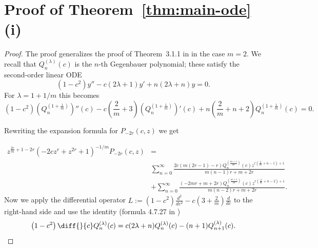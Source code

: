 \documentclass[final,nopreprintline]{elsarticle}
\theoremstyle{definition}
\numberwithin{equation}{section}
\theoremstyle{remark}
\begin{document}
\medskip

\appendix

\section{Proof of Theorem~\ref{thm:main-ode}(i)}\label{app:proof-type1}

\begin{proof}
The proof generalizes the proof of Theorem~3.1.1 in \cite{Cox2013DJKMPolynomials}
in the case $m=2$. We recall that $Q_n^{(\lambda)}(c)$ is the $n$-th Gegenbauer polynomial;
these satisfy the second-order linear ODE
\begin{equation*}
\left(1-c^2\right) y''-c (2 \lambda +1) y'+n(2 \lambda +n) y=0.
\end{equation*}
For $\lambda=1+1/m$ this becomes
\begin{equation}
\left(1-c^2\right) (Q_n^{\left(1+\frac{1}{m}\right)})''(c)-c \left(\frac{2}{m}+3\right) (Q_n^{\left(1+\frac{1}{m}\right)})'(c)+n \left(\frac{2}{m}+n+2\right) Q_n^{\left(1+\frac{1}{m}\right)}(c)=0.
\end{equation}

Rewriting the expansion formula for $P_{-2r}(c,z)$ we get

\begin{align}\label{eq3.3}
    z^{\frac{2r}{m}+1-2r} \left(-2 c z^r+z^{2 r}+1\right)^{-1/m} P_{-2r}(c,z)&=\nonumber\\
    &\sum _{n=0}^{\infty } \frac{2 c  (m (2 r-1)-r) Q_n^{\left(\frac{m+1}{m}\right)}(c) z^{r \left(\frac{2}{m}+n-1\right)+1}}{m (n-1) r+m+2 r}\nonumber\\
    &+\sum _{n=0}^{\infty } \frac{ (-2 m r+m+2 r) Q_n^{\left(\frac{m+1}{m}\right)}(c) z^{r \left(\frac{2}{m}+n-2\right)+1}}{m (n-2) r+m+2 r}.
\end{align}
Now we apply the differential operator $L:=(1-c^2)\frac{d^2}{dc^2}-c(3+\frac{2}{m})\frac{d}{dc}$ to the right-hand side and use the identity (formula 4.7.27 in \cite{Szego1939})
\begin{equation}
    \left(1-c^2\right) \diff{}{c}Q_n^{(\lambda )}(c)=c (2 \lambda +n) Q_n^{(\lambda )}(c)-(n+1) Q_{n+1}^{(\lambda )}(c).
\end{equation}


\end{proof}
\end{document}
